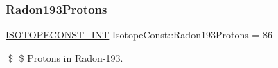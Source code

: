 \subsubsection{\texorpdfstring{Radon193\+Protons}{Radon193Protons}}
{\footnotesize\ttfamily \mbox{\hyperlink{group___isotope_const-_macros_ga5f18360b3e99483a35c32d789e62621c}{I\+S\+O\+T\+O\+P\+E\+C\+O\+N\+S\+T\+\_\+\+I\+NT}} Isotope\+Const\+::\+Radon193\+Protons = 86}

\$ \$ Protons in Radon-\/193. 